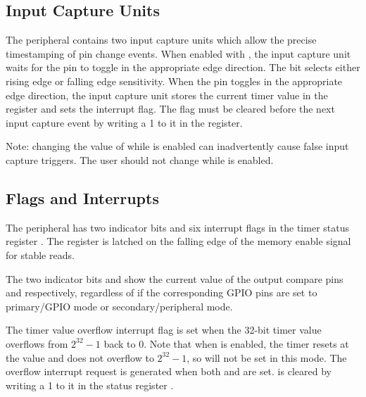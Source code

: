 \subsection{Input Capture Units}

The  peripheral contains two input capture units which allow the precise timestamping of pin change events. When enabled with , the input capture unit waits for the  pin to toggle in the appropriate edge direction. The  bit selects either rising edge or falling edge sensitivity. When the pin toggles in the appropriate edge direction, the input capture unit stores the current timer value in the  register and sets the  interrupt flag. The  flag must be cleared before the next input capture event by writing a 1 to it in the  register.

Note: changing the value of  while  is enabled can inadvertently cause false input capture triggers. The user should not change  while  is enabled.



\subsection{Flags and Interrupts}

The  peripheral has two indicator bits and six interrupt flags in the timer status register . The  register is latched on the falling edge of the memory enable signal for stable reads.

The two indicator bits  and  show the current value of the output compare pins  and  respectively, regardless of if the corresponding GPIO pins are set to primary/GPIO mode or secondary/peripheral mode.

The timer value overflow interrupt flag  is set when the 32-bit timer value overflows from $2^{32} - 1$ back to 0. Note that when  is enabled, the timer resets at the  value and does not overflow to $2^{32} - 1$, so  will not be set in this mode. The overflow interrupt request is generated when both  and  are set.  is cleared by writing a 1 to it in the status register .

